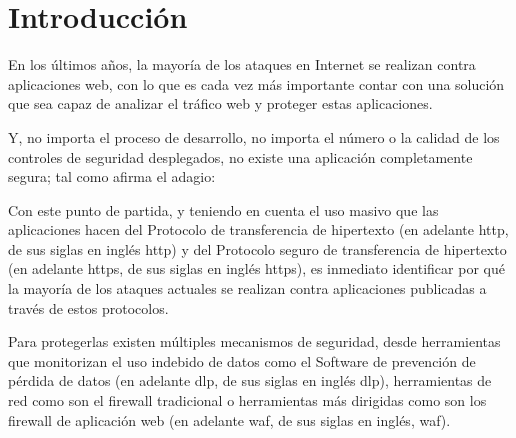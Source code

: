 \chapter{Introducción}
\par En los últimos años, la mayoría de los ataques en Internet se realizan contra aplicaciones web, con lo que es cada vez más importante contar con una
solución que sea capaz de analizar el tráfico web y proteger estas aplicaciones.
\par Y, no importa el proceso de desarrollo, no importa el número o la calidad de los controles de seguridad desplegados, no existe una aplicación completamente
segura; tal como afirma el adagio:


\par Con este punto de partida, y teniendo en cuenta el uso masivo que las aplicaciones hacen del Protocolo de transferencia de hipertexto (en adelante
\acrshort{http}, de sus siglas en inglés \acrlong{http}) y del Protocolo seguro de transferencia de hipertexto (en adelante \acrshort{https}, de sus siglas en
inglés \acrlong{https}), es inmediato identificar por qué la mayoría de los ataques actuales se realizan contra aplicaciones publicadas a través de estos
protocolos.

\par Para protegerlas existen múltiples mecanismos de seguridad, desde herramientas que monitorizan el uso indebido de datos como el Software de prevención de
pérdida de datos (en adelante \acrshort{dlp}, de sus siglas en inglés \acrlong{dlp}), herramientas de red como son el firewall tradicional o herramientas más
dirigidas como son los firewall de aplicación web (en adelante \acrshort{waf}, de sus siglas en inglés, \acrlong{waf}).

